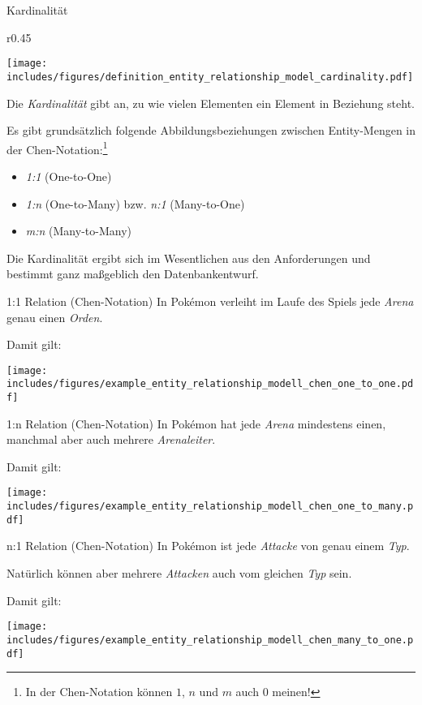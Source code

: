 \begin{defi}{Kardinalität}
    \begin{wrapfigure}{r}{0.45\textwidth}
        \begin{center}
            \texttt{[image: includes/figures/definition\_entity\_relationship\_model\_cardinality.pdf]}
        \end{center}
    \end{wrapfigure}
    Die \emph{Kardinalität} gibt an, zu wie vielen Elementen ein Element in Beziehung steht.

    Es gibt grundsätzlich folgende Abbildungsbeziehungen zwischen Entity-Mengen in der Chen-Notation:\footnote{In der Chen-Notation können $1$, $n$ und $m$ auch $0$ meinen!}
    \begin{itemize}
        \item \emph{1:1} (One-to-One)
        \item \emph{1:n} (One-to-Many) bzw. \emph{n:1} (Many-to-One)
        \item \emph{m:n} (Many-to-Many)
    \end{itemize}

    Die Kardinalität ergibt sich im Wesentlichen aus den Anforderungen und bestimmt ganz maßgeblich den Datenbankentwurf.
\end{defi}

\newpage

\begin{example}{1:1 Relation (Chen-Notation)}
    In Pokémon verleiht im Laufe des Spiels jede \emph{Arena} genau einen \emph{Orden}.

    Damit gilt:
    \begin{center}
        \texttt{[image: includes/figures/example\_entity\_relationship\_modell\_chen\_one\_to\_one.pdf]}
    \end{center}
\end{example}

\begin{example}{1:n Relation (Chen-Notation)}
    In Pokémon hat jede \emph{Arena} mindestens einen, manchmal aber auch mehrere \emph{Arenaleiter}.

    Damit gilt:
    \begin{center}
        \texttt{[image: includes/figures/example\_entity\_relationship\_modell\_chen\_one\_to\_many.pdf]}
    \end{center}
\end{example}

\begin{example}{n:1 Relation (Chen-Notation)}
    In Pokémon ist jede \emph{Attacke} von genau einem \emph{Typ}.

    Natürlich können aber mehrere \emph{Attacken} auch vom gleichen \emph{Typ} sein.

    Damit gilt:
    \begin{center}
        \texttt{[image: includes/figures/example\_entity\_relationship\_modell\_chen\_many\_to\_one.pdf]}
    \end{center}
\end{example}

